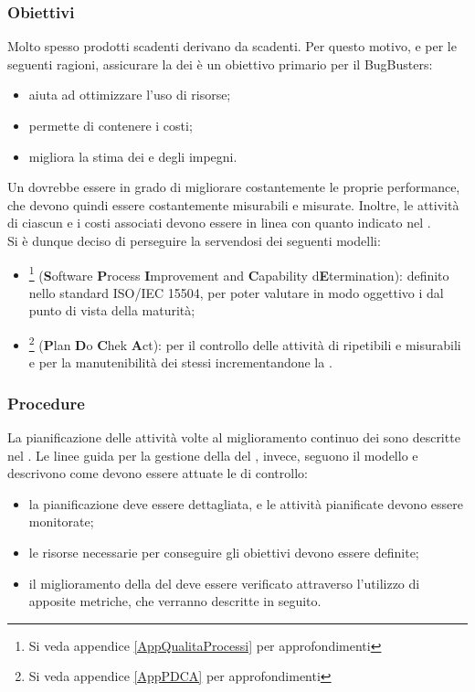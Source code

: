 \subsubsection{Obiettivi}
Molto spesso prodotti scadenti derivano da  scadenti. Per questo motivo, e per le seguenti ragioni, assicurare la  dei  è un obiettivo primario per il  BugBusters:
\begin{itemize}
	\item aiuta ad ottimizzare l'uso di risorse;
	\item permette di contenere i costi;
	\item migliora la stima dei  e degli impegni.
\end{itemize}
Un  dovrebbe essere in grado di migliorare costantemente le proprie performance, che devono quindi essere costantemente misurabili e misurate. Inoltre, le attività di ciascun  e i costi associati devono essere in linea con quanto indicato nel \PianoDiProgetto. \\
Si è dunque deciso di perseguire la  servendosi dei seguenti modelli: 
\begin{itemize}
	\item {}\footnote{Si veda appendice \ref{AppQualitaProcessi} per approfondimenti} (\textbf{S}oftware \textbf{P}rocess \textbf{I}mprovement and \textbf{C}apability d\textbf{E}termination): definito nello standard ISO/IEC 15504, per poter valutare in modo oggettivo i  dal punto di vista della maturità;
	\item {}\footnote{Si veda appendice \ref{AppPDCA} per approfondimenti} (\textbf{P}lan \textbf{D}o \textbf{C}hek \textbf{A}ct): per il controllo delle attività di  ripetibili e misurabili e per la manutenibilità dei  stessi incrementandone la .
\end{itemize}

\subsubsection{Procedure}
La pianificazione delle attività volte al miglioramento continuo dei  sono descritte nel \PianoDiProgetto. Le linee guida per la gestione della  del , invece, seguono il modello  e descrivono come devono essere attuate le  di controllo:
\begin{itemize}
	\item la pianificazione deve essere dettagliata, e le attività pianificate devono essere monitorate;
	\item le risorse necessarie per conseguire gli obiettivi devono essere definite;
	\item il miglioramento della  del  deve essere verificato attraverso l'utilizzo di apposite metriche, che verranno descritte in seguito.
\end{itemize}

